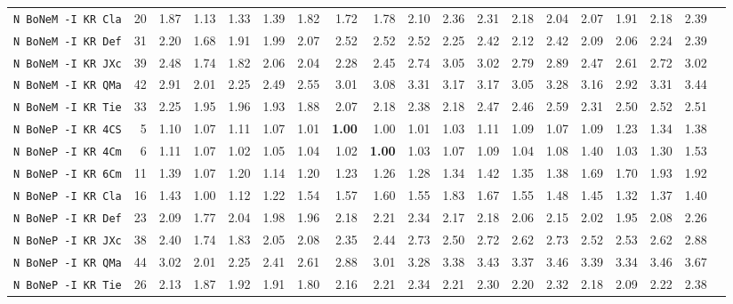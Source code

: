 \begin{tabular}{l | r @{~~} r | r@{~~}r@{~~}r@{~~}r@{~~}r@{~~}r@{~~}r@{~~}r@{~~}r@{~~}r@{~~}r@{~~}r@{~~}r@{~~}r@{~~}r@{~~}r|}
\verb+N BoNeM -I KR Cla+ & 20 & 1.87 & 1.13&1.33&1.39&1.82&1.72&1.78&2.10&2.36&2.31&2.18&2.04&2.07&1.91&2.18&2.39\\
\verb+N BoNeM -I KR Def+ & 31 & 2.20 & 1.68&1.91&1.99&2.07&2.52&2.52&2.52&2.25&2.42&2.12&2.42&2.09&2.06&2.24&2.39\\
\verb+N BoNeM -I KR JXc+ & 39 & 2.48 & 1.74&1.82&2.06&2.04&2.28&2.45&2.74&3.05&3.02&2.79&2.89&2.47&2.61&2.72&3.02\\
\verb+N BoNeM -I KR QMa+ & 42 & 2.91 & 2.01&2.25&2.49&2.55&3.01&3.08&3.31&3.17&3.17&3.05&3.28&3.16&2.92&3.31&3.44\\
\verb+N BoNeM -I KR Tie+ & 33 & 2.25 & 1.95&1.96&1.93&1.88&2.07&2.18&2.38&2.18&2.47&2.46&2.59&2.31&2.50&2.52&2.51\\
\verb+N BoNeP -I KR 4CS+ & 5 & 1.10 & 1.07&1.11&1.07&1.01&\textbf{1.00}&1.00&1.01&1.03&1.11&1.09&1.07&1.09&1.23&1.34&1.38\\
\verb+N BoNeP -I KR 4Cm+ & 6 & 1.11 & 1.07&1.02&1.05&1.04&1.02&\textbf{1.00}&1.03&1.07&1.09&1.04&1.08&1.40&1.03&1.30&1.53\\
\verb+N BoNeP -I KR 6Cm+ & 11 & 1.39 & 1.07&1.20&1.14&1.20&1.23&1.26&1.28&1.34&1.42&1.35&1.38&1.69&1.70&1.93&1.92\\
\verb+N BoNeP -I KR Cla+ & 16 & 1.43 & 1.00&1.12&1.22&1.54&1.57&1.60&1.55&1.83&1.67&1.55&1.48&1.45&1.32&1.37&1.40\\
\verb+N BoNeP -I KR Def+ & 23 & 2.09 & 1.77&2.04&1.98&1.96&2.18&2.21&2.34&2.17&2.18&2.06&2.15&2.02&1.95&2.08&2.26\\
\verb+N BoNeP -I KR JXc+ & 38 & 2.40 & 1.74&1.83&2.05&2.08&2.35&2.44&2.73&2.50&2.72&2.62&2.73&2.52&2.53&2.62&2.88\\
\verb+N BoNeP -I KR QMa+ & 44 & 3.02 & 2.01&2.25&2.41&2.61&2.88&3.01&3.28&3.38&3.43&3.37&3.46&3.39&3.34&3.46&3.67\\
\verb+N BoNeP -I KR Tie+ & 26 & 2.13 & 1.87&1.92&1.91&1.80&2.16&2.21&2.34&2.21&2.30&2.20&2.32&2.18&2.09&2.22&2.38\\
\end{tabular}
